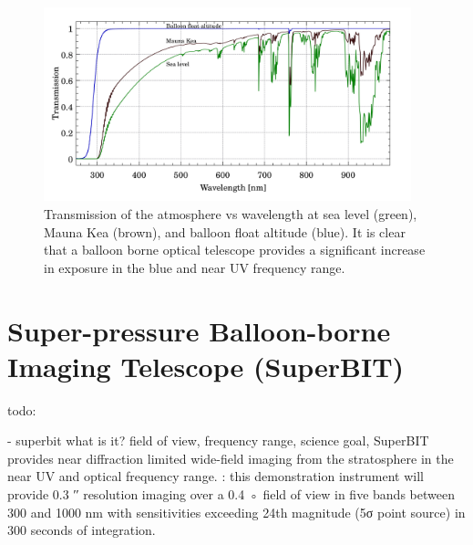 \begin{figure}
    \begin{small}
        \begin{center}
            \includegraphics[width=0.95\textwidth]{Introduction/figs/atmosphere.jpg}
        \end{center}
        \caption{Transmission of the atmosphere vs wavelength at sea level (green), Mauna Kea (brown), and balloon float altitude (blue). It is clear that a balloon borne optical telescope provides a significant increase in exposure in the blue and near UV frequency range.}
        \label{fig:atmos}
    \end{small}
\end{figure}


\section{Super-pressure Balloon-borne Imaging Telescope (SuperBIT)}

todo: 

- superbit what is it? field of view, frequency range, science goal, 
SuperBIT provides near diffraction limited wide-field imaging from the stratosphere in the near UV and optical frequency range.  : this demonstration instrument will provide 0.3 ′′ resolution imaging over a 0.4 ◦ field of view in five bands between 300 and 1000 nm with sensitivities exceeding 24th magnitude (5σ point source) in 300 seconds of integration.


